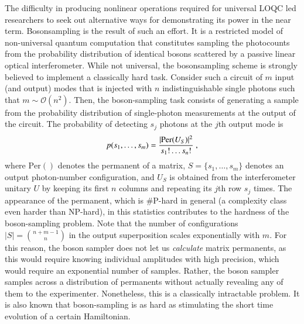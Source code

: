 \documentclass[times,final]{elsarticle}
\begin{document}
The difficulty in producing nonlinear operations required for universal LOQC led researchers to seek out alternative ways for demonstrating its power in the near term. {\sc Bosonsampling} is the result of such an effort. It is a restricted model of non-universal quantum computation \cite{bib:Aaronson11} that constitutes sampling the photocounts from the probability distribution of identical bosons scattered by a passive linear optical interferometer. While not universal, the {\sc bosonsampling} scheme is strongly believed to implement a classically hard task. Consider such a circuit of $m$ input (and output) modes that is injected with $n$ indistinguishable single photons such that $m\sim \mathcal{O}(n^2)$. Then, the boson-sampling task consists of generating a sample from the probability distribution of single-photon measurements at the output of the circuit. The probability of detecting $s_j$ photons at the $j$th output mode is
\begin{align}
p(s_1,\ldots,s_m)=\frac{|{\rm Per}(U_S)|^2}{s_1!\ldots s_n!} \ ,	
\end{align}
where $\text{Per}()$ denotes the permanent of a matrix, $S=\{s_1,\dots,s_m\}$ denotes an output photon-number configuration, and $U_S$ is obtained from the interferometer unitary $U$ by keeping its first $n$ columns and repeating its $j$th row $s_j$ times. The appearance of the permanent, which is \#P-hard in general (a complexity class even harder than NP-hard), in this statistics contributes to the hardness of the boson-sampling problem. Note that the number of configurations $|S|=\binom{n+m-1}{n}$ in the output superposition scales exponentially with $m$. For this reason, the boson sampler does not let us \emph{calculate} matrix permanents, as this would require knowing individual amplitudes with high precision, which would require an exponential number of samples. Rather, the boson sampler samples across a distribution of permanents without actually revealing any of them to the experimenter. Nonetheless, this is a classically intractable problem. It is also known that boson-sampling is as hard as stimulating the short time evolution of a certain Hamiltonian\cite{bib:Peropadre17}.
\end{document}
